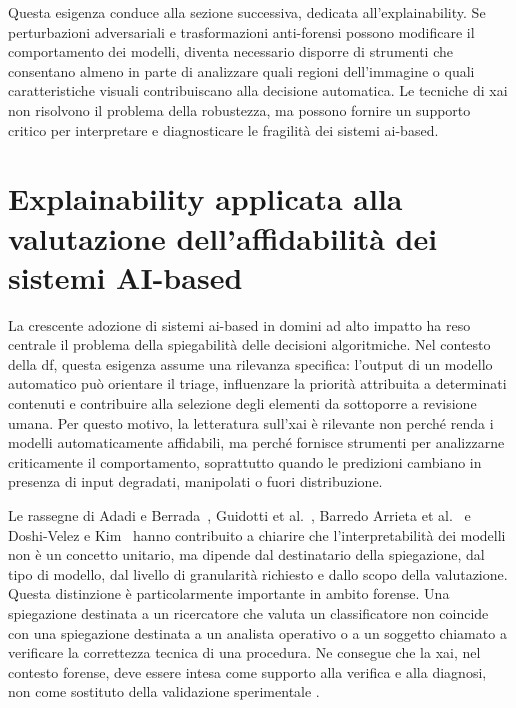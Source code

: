 Questa esigenza conduce alla sezione successiva, dedicata all'explainability. Se perturbazioni adversariali e trasformazioni anti-forensi possono modificare il comportamento dei modelli, diventa necessario disporre di strumenti che consentano almeno in parte di analizzare quali regioni dell'immagine o quali caratteristiche visuali contribuiscano alla decisione automatica. Le tecniche di \gls{xai} non risolvono il problema della robustezza, ma possono fornire un supporto critico per interpretare e diagnosticare le fragilità dei sistemi \gls{ai}-based.


\section{Explainability applicata alla valutazione dell'affidabilità dei sistemi AI-based}
\label{sec:sota-xai}

La crescente adozione di sistemi \gls{ai}-based in domini ad alto impatto ha reso centrale il problema della spiegabilità delle decisioni algoritmiche. Nel contesto della \gls{df}, questa esigenza assume una rilevanza specifica: l'output di un modello automatico può orientare il triage, influenzare la priorità attribuita a determinati contenuti e contribuire alla selezione degli elementi da sottoporre a revisione umana. Per questo motivo, la letteratura sull'\gls{xai} è rilevante non perché renda i modelli automaticamente affidabili, ma perché fornisce strumenti per analizzarne criticamente il comportamento, soprattutto quando le predizioni cambiano in presenza di input degradati, manipolati o fuori distribuzione.

Le rassegne di Adadi e Berrada~\cite{Adadi2018}, Guidotti et al.~\cite{Guidotti2019}, Barredo Arrieta et al.~\cite{Barredo2018} e Doshi-Velez e Kim~\cite{Doshi-Velez2017} hanno contribuito a chiarire che l'interpretabilità dei modelli non è un concetto unitario, ma dipende dal destinatario della spiegazione, dal tipo di modello, dal livello di granularità richiesto e dallo scopo della valutazione. Questa distinzione è particolarmente importante in ambito forense. Una spiegazione destinata a un ricercatore che valuta un classificatore non coincide con una spiegazione destinata a un analista operativo o a un soggetto chiamato a verificare la correttezza tecnica di una procedura. Ne consegue che la \gls{xai}, nel contesto forense, deve essere intesa come supporto alla verifica e alla diagnosi, non come sostituto della validazione sperimentale \cite{Adadi2018,Doshi-Velez2017,sanna2025cybercrime}.

